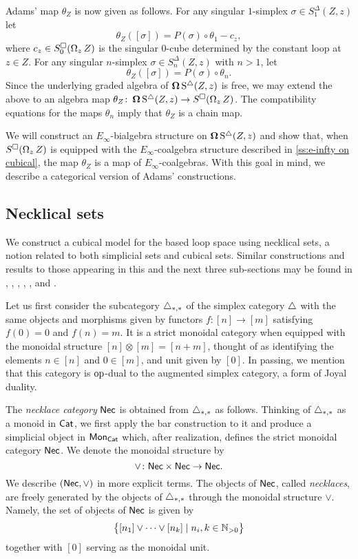 Adams' map $\theta_Z$ is now given as follows.
For any singular $1$-simplex $\sigma \in S^{\Delta}_1(Z, z)$ let
\[
\theta_Z([\sigma]) = P(\sigma) \circ \theta_1 - c_z,
\]
where $c_z \in S^{\square}_0(\operatorname{\Omega}_z Z)$ is the singular $0$-cube determined by the constant loop at $z \in Z$.
For any singular $n$-simplex $\sigma \in S^{\Delta}_n(Z, z)$ with $n>1$, let
\[
\theta_Z([\sigma]) = P(\sigma) \circ \theta_n.
\]
Since the underlying graded algebra of $\operatorname{\mathbf{\Omega}} \operatorname{S^{\triangle}}(Z, z)$ is free, we may extend the above to an algebra map $\theta_Z \colon \operatorname{\mathbf{\Omega}} \operatorname{S^{\triangle}}(Z, z) \to S^{\square}(\operatorname{\Omega}_z Z)$.
The compatibility equations for the maps $\theta_n$ imply that $\theta_Z$ is a chain map.

We will construct an $E_{\infty}$-bialgebra structure on $\operatorname{\mathbf{\Omega}} \operatorname{S^{\triangle}}(Z, z)$ and show that, when $S^{\square}(\operatorname{\Omega}_z Z)$ is equipped with the $E_{\infty}$-coalgebra structure described in \cref{ss:e-infty on cubical}, the map $\theta_Z$ is a map of $E_{\infty}$-coalgebras.
With this goal in mind, we describe a categorical version of Adams' constructions.

\subsection{Necklical sets}

We construct a cubical model for the based loop space using necklical sets, a notion related to both simplicial sets and cubical sets.
Similar constructions and results to those appearing in this and the next three sub-sections may be found in \cite{baues1980geometry}, \cite{berger1995loops}, \cite{baues1998hopf}, \cite{dugger2011rigidification}, \cite{galvez2020hopf}, and \cite{rivera2018cubical, rivera2019path}.

Let us first consider the subcategory $\triangle_{*,*}$ of the simplex category $\triangle$ with the same objects and morphisms given by functors $f \colon [n] \to [m]$ satisfying $f(0) = 0$ and $f(n) = m$.
It is a strict monoidal category when equipped with the monoidal structure $[n] \otimes [m] = [n+m]$, thought of as identifying the elements $n \in [n]$ and $0 \in [m]$, and unit given by $[0]$.
In passing, we mention that this category is $\mathrm{op}$-dual to the augmented simplex category, a form of Joyal duality.

The \textit{necklace category} $\mathsf{Nec}$ is obtained from $\triangle_{*,*}$ as follows.
Thinking of $\triangle_{*,*}$ as a monoid in $\mathsf{Cat}$, we first apply the bar construction to it and produce a simplicial object in $\mathsf{Mon}_{\mathsf{Cat}}$ which, after realization, defines the strict monoidal category $\mathsf{Nec}$.
We denote the monoidal structure by
\[
\vee \colon \mathsf{Nec} \times \mathsf{Nec} \to \mathsf{Nec}.
\]
We describe $(\mathsf{Nec}, \vee)$ in more explicit terms.
The objects of $\mathsf{Nec}$, called \textit{necklaces}, are freely generated by the objects of $\triangle_{*,*}$ through the monoidal structure $\vee$.
Namely, the set of objects of $\mathsf{Nec}$ is given by
\[
\big\{ [n_1] \vee \dots \vee[n_k] \mid n_i, k \in \mathbb{N}_{>0} \big\}
\]
together with $[0]$ serving as the monoidal unit.

